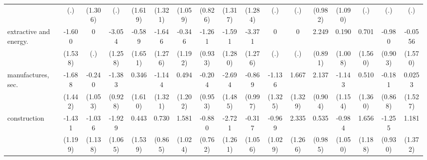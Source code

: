 {\begin{tabular}{l*{16}{c}}
                    &         (.)         &     (1.306)         &         (.)         &     (1.619)         &     (1.321)         &     (1.059)         &     (0.826)         &     (1.317)         &     (1.284)         &         (.)         &         (.)         &     (0.982)         &     (1.090)         &         (.)         &         (.)         &         (.)         \\
[1em]
extractive and energy.&      -1.600         &           0         &      -3.054\sym{*}  &      -0.589         &      -1.646         &      -0.346         &      -1.261         &      -1.591         &      -3.371\sym{**} &           0         &           0         &       2.249\sym{*}  &       0.190         &       0.701         &      -0.980         &     -0.0556         \\
                    &     (1.538)         &         (.)         &     (1.258)         &     (1.651)         &     (1.276)         &     (1.192)         &     (0.933)         &     (1.280)         &     (1.276)         &         (.)         &         (.)         &     (0.891)         &     (1.008)         &     (1.560)         &     (0.903)         &     (1.570)         \\
[1em]
manufactures, sec.  &      -1.688         &      -0.240         &      -1.383         &       0.346         &      -1.144         &       0.494         &      -0.204         &      -2.694         &      -0.869         &      -1.136         &       1.667         &       2.137\sym{*}  &      -1.143         &       0.510         &      -0.181         &      0.0253         \\
                    &     (1.442)         &     (1.053)         &     (0.928)         &     (1.610)         &     (1.321)         &     (1.202)         &     (0.953)         &     (1.485)         &     (0.997)         &     (1.325)         &     (1.329)         &     (0.904)         &     (1.154)         &     (1.360)         &     (0.868)         &     (1.527)         \\
[1em]
construction        &      -1.431         &      -1.036         &      -1.929         &       0.443         &       0.730         &       1.581         &      -0.880         &      -2.721\sym{*}  &      -0.317         &      -0.969         &       2.335         &       0.535         &      -0.984         &       1.656         &      -1.255         &       1.181         \\
                    &     (1.199)         &     (1.138)         &     (1.065)         &     (1.539)         &     (0.865)         &     (1.024)         &     (0.762)         &     (1.261)         &     (1.056)         &     (1.029)         &     (1.266)         &     (0.985)         &     (1.050)         &     (1.188)         &     (0.930)         &     (1.372)         \\

\end{tabular}}
